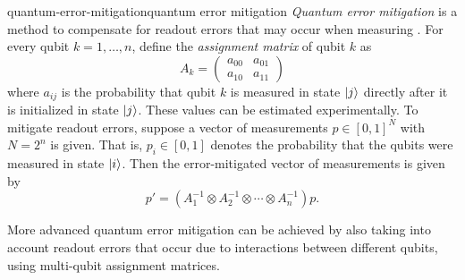 \begin{topic}{quantum-error-mitigation}{quantum error mitigation}
    \emph{Quantum error mitigation} is a method to compensate for readout errors that may occur when measuring . For every qubit $k = 1, \ldots, n$, define the \textit{assignment matrix} of qubit $k$ as
    \[ A_k = \begin{pmatrix} a_{00} & a_{01} \\ a_{10} & a_{11} \end{pmatrix} \]
    where $a_{ij}$ is the probability that qubit $k$ is measured in state $|j\rangle$ directly after it is initialized in state $|j\rangle$. These values can be estimated experimentally. To mitigate readout errors, suppose a vector of measurements $p \in [0, 1]^{N}$ with $N = 2^n$ is given. That is, $p_i \in [0, 1]$ denotes the probability that the qubits were measured in state $|i\rangle$. Then the error-mitigated vector of measurements is given by
    \[ p' = (A_1^{-1} \otimes A_2^{-1} \otimes \cdots \otimes A_{n}^{-1}) p . \]
    
    More advanced quantum error mitigation can be achieved by also taking into account readout errors that occur due to interactions between different qubits, using multi-qubit assignment matrices.
\end{topic}
